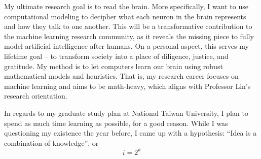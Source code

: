 \documentclass[letterpaper,12pt]{article}
\begin{document}
My ultimate research goal is to read the brain. More specifically, I want to use computational modeling to decipher what each neuron in the brain represents and how they talk to one another. This will be a transformative contribution to the machine learning research community, as it reveals the missing piece to fully model artificial intelligence after humans. On a personal aspect, this serves my lifetime goal -- to transform society into a place of diligence, justice, and gratitude. My method is to let computers learn our brain using robust mathematical models and heuristics. That is, my research career focuses on machine learning and aims to be math-heavy, which aligns with Professor Lin's research orientation.

In regards to my graduate study plan at National Taiwan University, I plan to spend as much time learning as possible, for a good reason. While I was questioning my existence the year before, I came up with a hypothesis: ``Idea is a combination of knowledge'', or
\[ i = 2^k \]
\end{document}
